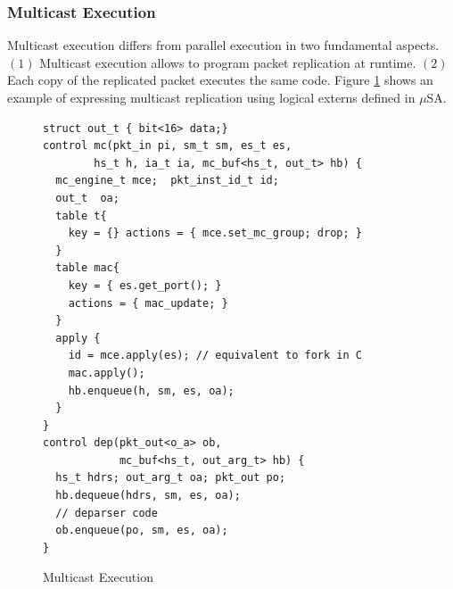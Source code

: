 \subsubsection{Multicast Execution}
\label{subsubsection:multicast-execution}
Multicast execution differs from parallel execution in two fundamental aspects.
$(1)$ Multicast execution allows to program packet replication at runtime.
$(2)$ Each copy of the replicated packet executes the same code.
Figure \ref{fig:multicast-execution} shows an example of expressing multicast replication using logical externs defined in $\mu$SA.
\begin{figure}[ht]
\begin{lstlisting}[frame=none]
struct out_t { bit<16> data;}
control mc(pkt_in pi, sm_t sm, es_t es, 
        hs_t h, ia_t ia, mc_buf<hs_t, out_t> hb) {
  mc_engine_t mce;  pkt_inst_id_t id; 
  out_t  oa;
  table t{
    key = {} actions = { mce.set_mc_group; drop; }
  }
  table mac{
    key = { es.get_port(); } 
    actions = { mac_update; }
  }
  apply {
    id = mce.apply(es); // equivalent to fork in C
    mac.apply();
    hb.enqueue(h, sm, es, oa);
  }
}
control dep(pkt_out<o_a> ob, 
            mc_buf<hs_t, out_arg_t> hb) {
  hs_t hdrs; out_arg_t oa; pkt_out po;
  hb.dequeue(hdrs, sm, es, oa);
  // deparser code 
  ob.enqueue(po, sm, es, oa);
}
\end{lstlisting}
\caption{Multicast Execution}
\label{fig:multicast-execution}
\end{figure}



